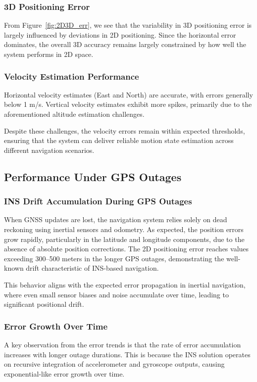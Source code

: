 \documentclass[conference]{IEEEtran}
\begin{document}
\subsubsection{3D Positioning Error}
From Figure~\ref{fig:2D3D_err}, we see that the variability in 3D positioning error is largely influenced by deviations in 2D positioning. Since the horizontal error dominates, the overall 3D accuracy remains largely constrained by how well the system performs in 2D space.

\subsubsection{Velocity Estimation Performance}

Horizontal velocity estimates (East and North) are accurate, with errors generally below 1 m/s. 
Vertical velocity estimates exhibit more spikes, primarily due to the aforementioned altitude estimation challenges. 

Despite these challenges, the velocity errors remain within expected thresholds, ensuring that the system can deliver reliable motion state estimation across different navigation scenarios.

\subsection{Performance Under GPS Outages}

\subsubsection{INS Drift Accumulation During GPS Outages}
When GNSS updates are lost, the navigation system relies solely on dead reckoning using inertial sensors and odometry. As expected, the position errors grow rapidly, particularly in the latitude and longitude components, due to the absence of absolute position corrections. The 2D positioning error reaches values exceeding 300–500 meters in the longer GPS outages, demonstrating the well-known drift characteristic of INS-based navigation.

This behavior aligns with the expected error propagation in inertial navigation, where even small sensor biases and noise accumulate over time, leading to significant positional drift.

\subsubsection{Error Growth Over Time}
A key observation from the error trends is that the rate of error accumulation increases with longer outage durations. This is because the INS solution operates on recursive integration of accelerometer and gyroscope outputs, causing exponential-like error growth over time.
\end{document}
